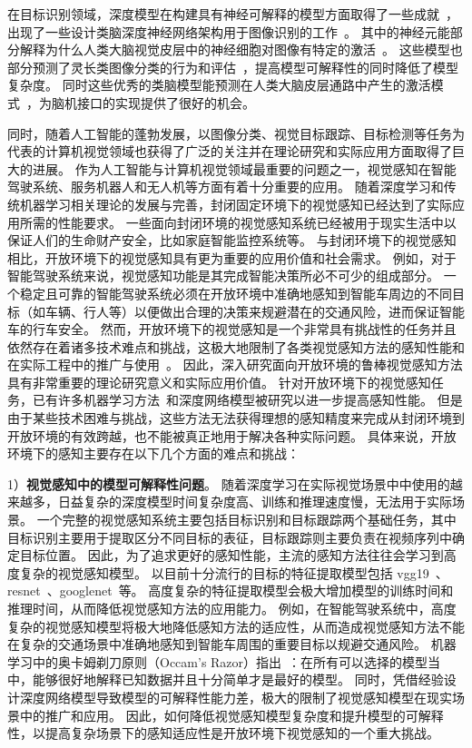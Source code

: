 \documentclass[a4paper,zihao=-4]{article}
\begin{document}
在目标识别领域，深度模型在构建具有神经可解释的模型方面取得了一些成就~\cite{RN687}，
出现了一些设计类脑深度神经网络架构用于图像识别的工作~\cite{RN1115, RN688}。
其中的神经元能部分解释为什么人类大脑视觉皮层中的神经细胞对图像有特定的激活~\cite{RN1127,RN1144,RN1145,RN1535,RN1146,RN1100}。
这些模型也部分预测了灵长类图像分类的行为和评估~\cite{RN730,RN1139}，提高模型可解释性的同时降低了模型复杂度。
同时这些优秀的类脑模型能预测在人类大脑皮层通路中产生的激活模式~\cite{RN968}，为脑机接口的实现提供了很好的机会。

同时，随着人工智能的蓬勃发展，以图像分类、视觉目标跟踪、目标检测等任务为代表的计算机视觉领域也获得了广泛的关注并在理论研究和实际应用方面取得了巨大的进展。
作为人工智能与计算机视觉领域最重要的问题之一，视觉感知在智能驾驶系统、服务机器人和无人机等方面有着十分重要的应用。
随着深度学习和传统机器学习相关理论的发展与完善，封闭固定环境下的视觉感知已经达到了实际应用所需的性能要求。
一些面向封闭环境的视觉感知系统已经被用于现实生活中以保证人们的生命财产安全，比如家庭智能监控系统等。
与封闭环境下的视觉感知相比，开放环境下的视觉感知具有更为重要的应用价值和社会需求。
例如，对于智能驾驶系统来说，视觉感知功能是其完成智能决策所必不可少的组成部分。
一个稳定且可靠的智能驾驶系统必须在开放环境中准确地感知到智能车周边的不同目标（如车辆、行人等）以便做出合理的决策来规避潜在的交通风险，进而保证智能车的行车安全。
然而，开放环境下的视觉感知是一个非常具有挑战性的任务并且依然存在着诸多技术难点和挑战，这极大地限制了各类视觉感知方法的感知性能和在实际工程中的推广与使用~\cite{RN308}。
因此，深入研究面向开放环境的鲁棒视觉感知方法具有非常重要的理论研究意义和实际应用价值。
针对开放环境下的视觉感知任务，已有许多机器学习方法~\cite{smeulders2013visual}和深度网络模型\cite{li2018deep}被研究以进一步提高感知性能。
但是由于某些技术困难与挑战，这些方法无法获得理想的感知精度来完成从封闭环境到开放环境的有效跨越，也不能被真正地用于解决各种实际问题。
具体来说，开放环境下的感知主要存在以下几个方面的难点和挑战：

1）\textbf{视觉感知中的模型可解释性问题}。
随着深度学习在实际视觉场景中中使用的越来越多，日益复杂的深度模型时间复杂度高、训练和推理速度慢，无法用于实际场景。
%
一个完整的视觉感知系统主要包括目标识别和目标跟踪两个基础任务，其中目标识别主要用于提取区分不同目标的表征，目标跟踪则主要负责在视频序列中确定目标位置。
因此，为了追求更好的感知性能，主流的感知方法往往会学习到高度复杂的视觉感知模型。
以目前十分流行的目标的特征提取模型包括 vgg19~\cite{simonyan2014very}、resnet~\cite{he2016deep}、googlenet~\cite{szegedy2015going}等。
高度复杂的特征提取模型会极大增加模型的训练时间和推理时间，从而降低视觉感知方法的应用能力。
例如，在智能驾驶系统中，高度复杂的视觉感知模型将极大地降低感知方法的适应性，从而造成视觉感知方法不能在复杂的交通场景中准确地感知到智能车周围的重要目标以规避交通风险。
机器学习中的奥卡姆剃刀原则（Occam’s Razor）指出~\cite{ml_zhou}：在所有可以选择的模型当中，能够很好地解释已知数据并且十分简单才是最好的模型。
同时，凭借经验设计深度网络模型导致模型的可解释性能力差，极大的限制了视觉感知模型在现实场景中的推广和应用。
因此，如何降低视觉感知模型复杂度和提升模型的可解释性，以提高复杂场景下的感知适应性是开放环境下视觉感知的一个重大挑战。
\end{document}
